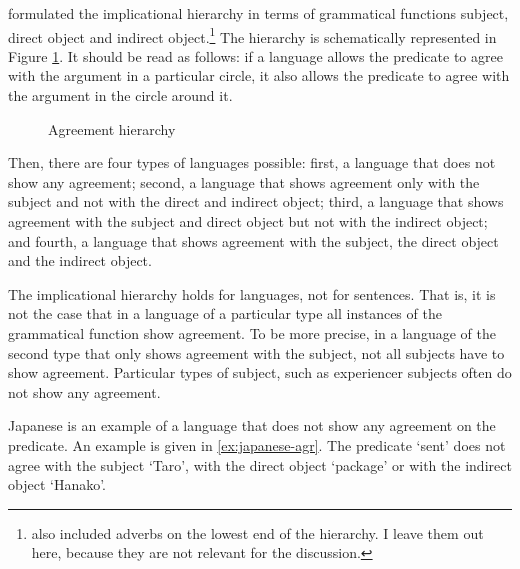\citet{moravcsik1978} formulated the implicational hierarchy in terms of grammatical functions subject, direct object and indirect object.\footnote{
\citet{moravcsik1978} also included adverbs on the lowest end of the hierarchy. I leave them out here, because they are not relevant for the discussion.
}
The hierarchy is schematically represented in Figure \ref{fig:agr-sub-do-io}. It should be read as follows: if a language allows the predicate to agree with the argument in a particular circle, it also allows the predicate to agree with the argument in the circle around it.

\begin{figure}[H]
  \centering
  \caption{Agreement hierarchy}
  \label{fig:agr-sub-do-io}
\end{figure}

Then, there are four types of languages possible: first, a language that does not show any agreement; second, a language that shows agreement only with the subject and not with the direct and indirect object; third, a language that shows agreement with the subject and direct object but not with the indirect object; and fourth, a language that shows agreement with the subject, the direct object and the indirect object.

The implicational hierarchy holds for languages, not for sentences. That is, it is not the case that in a language of a particular type all instances of the grammatical function show agreement. To be more precise, in a language of the second type that only shows agreement with the subject, not all subjects have to show agreement. Particular types of subject, such as experiencer subjects often do not show any agreement.

Japanese is an example of a language that does not show any agreement on the predicate. An example is given in \ref{ex:japanese-agr}. The predicate  `sent' does not agree with the subject  `Taro', with the direct object  `package' or with the indirect object  `Hanako'.

